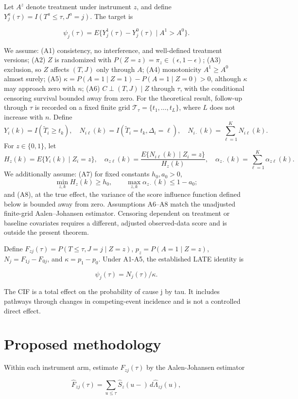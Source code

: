\documentclass[
  10pt,
  letterpaper,
]{article}
\begin{document}
Let $A^z$ denote treatment under instrument $z$, and define
$Y_j^a(\tau)=I(T^a\le\tau,J^a=j)$. The target is

\[
\psi_j(\tau)=E\{Y_j^1(\tau)-Y_j^0(\tau)\mid A^1>A^0\}.
\]

We assume: (A1) consistency, no interference, and well-defined treatment
versions; (A2) $Z$ is randomized with $P(Z=z)=\pi_z\in(\epsilon,1-\epsilon)$;
(A3) exclusion, so $Z$ affects $(T,J)$ only through $A$; (A4) monotonicity
$A^1\ge A^0$ almost surely; (A5)
$\kappa=P(A=1\mid Z=1)-P(A=1\mid Z=0)>0$, although $\kappa$
may approach zero with $n$; (A6) $C\perp(T,J)\mid Z$ through $\tau$,
with the conditional censoring survival bounded away from zero. For the
theoretical result, follow-up through $\tau$ is recorded on a fixed
finite grid $\mathcal T_\tau=\{t_1,\ldots,t_L\}$, where $L$ does not
increase with $n$. Define
\[
Y_i(k)=I(\widetilde T_i\ge t_k),\quad
N_{i\ell}(k)=I(\widetilde T_i=t_k,\Delta_i=\ell),\quad
N_{i\cdot}(k)=\sum_{\ell=1}^K N_{i\ell}(k).
\]
For $z\in\{0,1\}$, let
\[
H_z(k)=E\{Y_i(k)\mid Z_i=z\},\quad
\alpha_{z\ell}(k)=
\frac{E\{N_{i\ell}(k)\mid Z_i=z\}}{H_z(k)},\quad
\alpha_{z\cdot}(k)=\sum_{\ell=1}^K\alpha_{z\ell}(k).
\]
We additionally assume: (A7) for fixed constants $h_0,a_0>0$,
\[
\min_{z,k}H_z(k)\ge h_0,\qquad
\max_{z,k}\alpha_{z\cdot}(k)\le 1-a_0;
\]
and (A8), at the true effect, the variance of the score influence
function defined below is bounded away from zero. Assumptions A6--A8
match the unadjusted finite-grid Aalen--Johansen estimator. Censoring
dependent on treatment or baseline covariates requires a different,
adjusted observed-data score and is outside the present theorem.

Define $F_{zj}(\tau)=P(T\le\tau,J=j\mid Z=z)$,
$p_z=P(A=1\mid Z=z)$, $N_j=F_{1j}-F_{0j}$, and $\kappa=p_1-p_0$.
Under A1-A5, the established LATE identity is

\[
\psi_j(\tau)=N_j(\tau)/\kappa.
\]

The CIF is a total effect on the probability of cause j by tau. It
includes pathways through changes in competing-event incidence and is
not a controlled direct effect.

\section{Proposed methodology}

Within each instrument arm, estimate $F_{zj}(\tau)$ by the
Aalen-Johansen estimator

\[
\widehat F_{zj}(\tau)=\sum_{u\le\tau}\widehat S_z(u-)\,d\widehat\Lambda_{zj}(u),
\]
\end{document}
